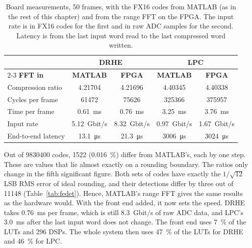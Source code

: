 \begin{table}[htbp]
\centering
\caption[Measured with the range FFT on chip]{Board measurements, 50 frames,
with the FX16 codes from MATLAB (as in the rest of this chapter) and from the
range FFT on the FPGA. The input rate is in FX16 codes for the first and in raw
ADC samples for the second. Latency is from the last input word read to the
last compressed word written.}
\label{tab:fe}
\small
\begin{tabular}{l|c|c|c|c}
& \multicolumn{2}{c|}{\textbf{DRHE}} & \multicolumn{2}{c}{\textbf{LPC}}\\
\cline{2-3}\cline{4-5}
\textbf{FFT in} & \textbf{MATLAB} & \textbf{FPGA} & \textbf{MATLAB} & \textbf{FPGA}\\
\hline
Compression ratio     & \num{4.21704} & \num{4.21696} & \num{4.40345} & \num{4.40338}\\
Cycles per frame      & \num{61472}   & \num{75626}   & \num{325366}  & \num{375957}\\
Time per frame        & \SI{0.61}{\milli\second} & \SI{0.76}{\milli\second} & \SI{3.25}{\milli\second} & \SI{3.76}{\milli\second}\\
Input rate            & \SI{5.12}{Gbit/s} & \SI{8.32}{Gbit/s} & \SI{0.97}{Gbit/s} & \SI{1.67}{Gbit/s}\\
End-to-end latency    & \SI{13.1}{\micro\second} & \SI{21.3}{\micro\second} & \SI{3006}{\micro\second} & \SI{3024}{\micro\second}\\
\end{tabular}
\end{table}

Out of \num{9830400} codes, \num{1522} (\SI{0.016}{\percent}) differ from
MATLAB's, each by one step. These are values that lie almost exactly on a
rounding boundary. The ratios only change in the fifth significant figure. Both
sets of codes have exactly the $1/\sqrt{12}$\,LSB RMS error of ideal rounding,
and their detections differ by three out of \num{11148}
(Table~\ref{tab:fedet}). Hence, MATLAB's range FFT gives the same results as
the hardware would. With the front end added, it now sets the speed. DRHE takes
\SI{0.76}{\milli\second} per frame, which is still \SI{8.3}{Gbit/s} of raw
ADC data, and LPC's \SI{3.0}{\milli\second} after the last input word does
not change. The front end uses \SI{7}{\percent} of the LUTs and 296 DSPs. The
whole system then uses \SI{47}{\percent} of the LUTs for DRHE and
\SI{46}{\percent} for LPC.

